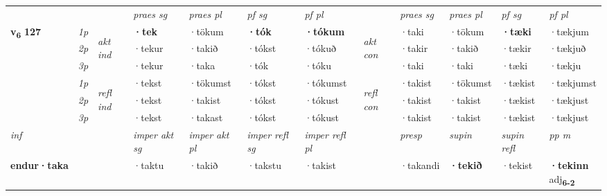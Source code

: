 \begin{longtable}[l]{X>{\footnotesize\itshape}llXXXXlXXXX}
\midrule

 & &   & \textit{praes sg}  & \textit{praes pl}    & \textit{ pf sg} & \textit{pf pl} & & \textit{praes sg}  & \textit{praes pl}    & \textit{pf sg} & \textit{pf pl }  \\ \cmidrule{4-7} \cmidrule{9-12}
 \multirow{2}{*}{{{\textbf{v{\textsubscript{6}}} \Large{\textbf{127}}}}}  & 1p & \multirow{3}{*}{\begin{turn}{90}\textit{akt ind}\end{turn}} & \textbf{·tek} & ·tökum & \textbf{·tók} & \textbf{·tókum} & \multirow{3}{*}{\begin{turn}{90}\textit{akt con}\end{turn}} &·taki & ·tökum & \textbf{·tæki} & ·tækjum\\*
 & 2p &  &  ·tekur  & ·takið & ·tókst & ·tókuð & & ·takir & ·takið & ·tækir & ·tækjuð \\*
 & 3p &  & ·tekur & ·taka & ·tók & ·tóku & & ·taki & ·taki& ·tæki & ·tækju \\*
\cmidrule{4-7} \cmidrule{9-12}
 & 1p & \multirow{3}{*}{\begin{turn}{90}\textit{refl ind}\end{turn}}  & ·tekst & ·tökumst & ·tókst & ·tókumst & \multirow{3}{*}{\begin{turn}{90}\textit{refl con}\end{turn}}  &·takist & ·tökumst & ·tækist & ·tækjumst \\*
 & 2p &  & ·tekst & ·takist & ·tókst & ·tókust & &·takist & ·takist & ·tækist & ·tækjust \\*
 & 3p  & & ·tekst & ·takast & ·tókst & ·tókust & & ·takist & ·takist& ·tækist & ·tækjust \\*
\cmidrule{4-7} \cmidrule{9-12}

   {\textit{inf}} & &  & \textit{imper akt sg} & \textit{imper akt pl} & \textit{imper refl sg} & \textit{imper refl pl} && \textit{presp} & \textit{supin} & \textit{supin refl} & \textit{pp m} \\*
  {\textbf{endur\allowbreak ·taka}} & && ·taktu  & ·takið & ·takstu & ·takist && ·takandi &  \textbf{·tekið} & ·tekist & \specialcell{\textbf{·tekinn} \\ adj\textbf{\textsubscript{6-2}}} \\*

\midrule


\end{longtable}
